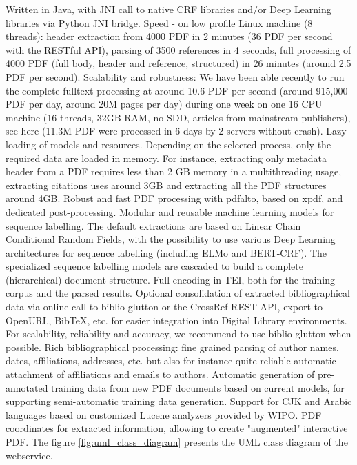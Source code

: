 \documentclass[
10pt, %
a4paper, %
oneside, %
headinclude,footinclude, %
BCOR5mm, %
]{scrartcl}
\begin{document}
Written in Java, with JNI call to native CRF libraries and/or Deep Learning libraries via Python JNI bridge.
Speed - on low profile Linux machine (8 threads): header extraction from 4000 PDF in 2 minutes (36 PDF per second with the RESTful API), parsing of 3500 references in 4 seconds, full processing of 4000 PDF (full body, header and reference, structured) in 26 minutes (around 2.5 PDF per second).
Scalability and robustness: We have been able recently to run the complete fulltext processing at around 10.6 PDF per second (around 915,000 PDF per day, around 20M pages per day) during one week on one 16 CPU machine (16 threads, 32GB RAM, no SDD, articles from mainstream publishers), see here (11.3M PDF were processed in 6 days by 2 servers without crash).
Lazy loading of models and resources. Depending on the selected process, only the required data are loaded in memory. For instance, extracting only metadata header from a PDF requires less than 2 GB memory in a multithreading usage, extracting citations uses around 3GB and extracting all the PDF structures around 4GB.
Robust and fast PDF processing with pdfalto, based on xpdf, and dedicated post-processing.
Modular and reusable machine learning models for sequence labelling. The default extractions are based on Linear Chain Conditional Random Fields, with the possibility to use various Deep Learning architectures for sequence labelling (including ELMo and BERT-CRF). The specialized sequence labelling models are cascaded to build a complete (hierarchical) document structure.
Full encoding in TEI, both for the training corpus and the parsed results.
Optional consolidation of extracted bibliographical data via online call to biblio-glutton or the CrossRef REST API, export to OpenURL, BibTeX, etc. for easier integration into Digital Library environments. For scalability, reliability and accuracy, we recommend to use biblio-glutton when possible.
Rich bibliographical processing: fine grained parsing of author names, dates, affiliations, addresses, etc. but also for instance quite reliable automatic attachment of affiliations and emails to authors.
Automatic generation of pre-annotated training data from new PDF documents based on current models, for supporting semi-automatic training data generation.
Support for CJK and Arabic languages based on customized Lucene analyzers provided by WIPO.
PDF coordinates for extracted information, allowing to create "augmented" interactive PDF. The figure \ref{fig:uml_class_diagram} presents the UML class diagram of the webservice. 
\end{document}
